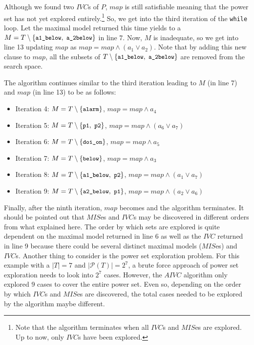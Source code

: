Although we found two $IVC$s of $P$, $map$ is still satisfiable meaning that the power set has not yet explored entirely.\footnote{Note that the algorithm terminates when all $IVC$s and $MIS$es are explored. Up to now, only $IVC$s have been explored.} So, we get into the third iteration of the \texttt{while} loop. Let the maximal model returned this time 
yields to a 
$M = T \setminus \{ \small{ \texttt{a1\_below},~\texttt{a\_2below}}\}$
 in line 7. 
Now, $M$ is inadequate, so we get into line 13 updating $map$ as 
$map = map \wedge (a_1 \vee a_2)$. 
Note that by adding this new clause to $map$, 
all the subsets of $T \setminus \{ \small{ \texttt{a1\_below},~\texttt{a\_2below}}\}$ 
are removed from the search space.

The algorithm continues similar to the third iteration leading to $M$ (in line 7) and $map$ (in line 13) to be as follows:
\begin{itemize}
  \item Iteration 4:  $M = T \setminus \{ \small{ \texttt{alarm}}\}$, $map = map \wedge a_4$
 
  \item Iteration 5: $M = T \setminus \{ \small{ \texttt{p1},~\texttt{p2}}\}$, $map = map \wedge (a_6 \vee a_7)$
 
  \item Iteration 6: $M = T \setminus \{ \small{ \texttt{doi\_on}}\}$, $map = map \wedge a_5$
 
  \item Iteration 7: $M = T \setminus \{ \small{ \texttt{below}}\}$, $map = map \wedge a_3$
 
  \item Iteration 8: $M = T \setminus \{ \small{ \texttt{a1\_below},~\texttt{p2}}\}$, $map = map \wedge (a_1 \vee a_7)$
      
  \item Iteration 9: $M = T \setminus \{ \small{ \texttt{a2\_below},~\texttt{p1}}\}$, $map = map \wedge (a_2 \vee a_6)$
\end{itemize}
Finally, after the ninth iteration, $map$ becomes \unsat and the algorithm terminates. 
It should be pointed out that $MIS$es and $IVC$s may be discovered in different orders from what explained here. The order by which sets are explored is
quite dependent on the maximal model returned in line 6 as well as the $IVC$ returned in line 9 because there could be several distinct maximal models ($MIS$es) and $IVC$s. Another thing to consider is the power set exploration problem. For this example with a $|T| = 7$ and $|\mathcal{P}(T)| = 2^7$, a brute force approach of power set exploration needs to look into  $2^7$ cases. However, the $AIVC$ algorithm only explored 9 cases to cover the entire power set. Even so, depending on the order by which $IVC$s and $MIS$es are discovered, the total cases needed to be explored by the algorithm maybe different.

